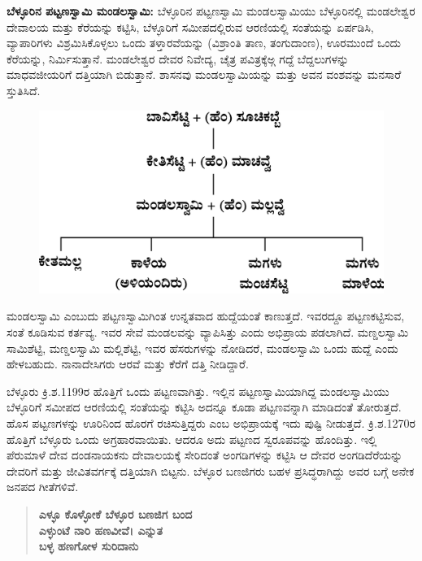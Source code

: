 \textbf{ಬೆಳ್ಳೂರಿನ ಪಟ್ಟಣಸ್ವಾಮಿ ಮಂಡಲಸ್ವಾಮಿ: } ಬೆಳ್ಳೂರಿನ ಪಟ್ಟಣಸ್ವಾಮಿ ಮಂಡಲಸ್ವಾಮಿಯು ಬೆಳ್ಳೂರಿನಲ್ಲಿ ಮಂಡಲೇಶ್ವರ ದೇವಾಲಯ ಮತ್ತು ಕೆರೆಯನ್ನು ಕಟ್ಟಿಸಿ, ಬೆಳ್ಳೂರಿಗೆ ಸಮೀಪದಲ್ಲಿರುವ ಆರಣಿಯಲ್ಲಿ ಸಂತೆಯನ್ನು ಏರ್ಪಡಿಸಿ, ವ್ಯಾಪಾರಿಗಳು ವಿಶ್ರಮಿಸಿಕೊಳ್ಳಲು ಒಂದು ತಳ್ತಾರವೆಯನ್ನು (ವಿಶ್ರಾಂತಿ ತಾಣ, ತಂಗುದಾಂಣ), ಊರಮುಂದೆ ಒಂದು ಕೆರೆಯನ್ನು, ನಿರ್ಮಿಸುತ್ತಾನೆ. ಮಂಡಲೇಶ್ವರ ದೇವರ ನಿವೇದ್ಯ, ಚೈತ್ರ ಪವಿತ್ರಕ್ಕೆಅ್ಗ ಗದ್ದೆ ಬೆದ್ದಲುಗಳನ್ನು ಮಾಧವಜೀಯರಿಗೆ ದತ್ತಿಯಾಗಿ ಬಿಡುತ್ತಾನೆ. ಶಾಸನವು ಮಂಡಲಸ್ವಾಮಿಯನ್ನು ಮತ್ತು ಅವನ ವಂಶವನ್ನು ಮನಸಾರೆ ಸ್ತುತಿಸಿದೆ.

\begin{figure}[!h]
\includegraphics{"images/chap7/chap7fig1.jpeg"}
\end{figure}

ಮಂಡಲಸ್ವಾಮಿ ಎಂಬುದು ಪಟ್ಟಣಸ್ವಾಮಿಗಿಂತ ಉನ್ನತವಾದ ಹುದ್ದೆಯಂತೆ ಕಾಣುತ್ತದೆ. ಇವರದ್ದೂ ಪಟ್ಟಣಕಟ್ಟಿಸುವ, ಸಂತೆ ಕೂಡಿಸುವ ಕರ್ತವ್ಯ. ಇವರ ಸೇವೆ ಮಂಡಲವನ್ನು ವ್ಯಾಪಿಸಿತ್ತು ಎಂದು ಅಭಿಪ್ರಾಯ ಪಡಲಾಗಿದೆ. ಮಣ್ಡಲಸ್ವಾಮಿ ಸಾಮಿಶೆಟ್ಟಿ, ಮಣ್ಡಲಸ್ವಾಮಿ ಮಲ್ಲಿಶೆಟ್ಟಿ, ಇವರ ಹೆಸರುಗಳನ್ನು ನೋಡಿದರೆ, ಮಂಡಲಸ್ವಾಮಿ ಒಂದು ಹುದ್ದೆ ಎಂದು ಹೇಳಬಹುದು. ನಾನಾದೇಸಿಗರು ಆರವೆ ಮತ್ತು ಕೆರೆಗೆ ದತ್ತಿ ನೀಡಿದ್ದಾರೆ.

ಬೆಳ್ಳೂರು ಕ್ರಿ.ಶ.1199ರ ಹೊತ್ತಿಗೆ ಒಂದು ಪಟ್ಟಣವಾಗಿತ್ತು. ಇಲ್ಲಿನ ಪಟ್ಟಣಸ್ವಾಮಿಯಾಗಿದ್ದ ಮಂಡಲಸ್ವಾಮಿಯು ಬೆಳ್ಳೂರಿಗೆ ಸಮೀಪದ ಆರಣಿಯಲ್ಲಿ ಸಂತೆಯನ್ನು ಕಟ್ಟಿಸಿ ಅದನ್ನೂ ಕೂಡಾ ಪಟ್ಟಣವನ್ನಾಗಿ ಮಾಡಿದಂತೆ ತೋರುತ್ತದೆ. ಹೊಸ ಪಟ್ಟಣಗಳನ್ನು ಊರಿನಿಂದ ಹೊರಗೆ ರಚಿಸುತ್ತಿದ್ದರು ಎಂಬ ಅಭಿಪ್ರಾಯಕ್ಕೆ ಇದು ಪುಷ್ಟಿ ನೀಡುತ್ತದೆ. ಕ್ರಿ.ಶ.1270ರ ಹೊತ್ತಿಗೆ ಬೆಳ್ಳೂರು ಒಂದು ಅಗ್ರಹಾರವಾಯಿತು. ಆದರೂ ಅದು ಪಟ್ಟಣದ ಸ್ವರೂಪವನ್ನು ಹೊಂದಿತ್ತು. ಇಲ್ಲಿ ಪೆರುಮಾಳೆ ದೇವ ದಂಡನಾಯಕನು ದೇವಾಲಯಕ್ಕೆ ಸೇರಿದಂತೆ ಅಂಗಡಿಗಳನ್ನು ಕಟ್ಟಿಸಿ ಆ ದೇವರ ಅಂಗಡಿದೆರೆಯನ್ನು ದೇವರಿಗೆ ಮತ್ತು ಜೀವಿತವರ್ಗಕ್ಕೆ ದತ್ತಿಯಾಗಿ ಬಿಟ್ಟನು. ಬೆಳ್ಳೂರ ಬಣಜಿಗರು ಬಹಳ ಪ್ರಸಿದ್ಧರಾಗಿದ್ದು ಅವರ ಬಗ್ಗೆ ಅನೇಕ ಜನಪದ ಗೀತೆಗಳಿವೆ.

\begin{verse}
\textbf{ಎಳ್ಳೂ ಕೊಳ್ಳೋಕೆ ಬೆಳ್ಳೂರ ಬಣಜಿಗ ಬಂದ} \\\textbf{ಎಳ್ಳುಂಟೆ ನಾರಿ ಹಣವೀವೆ। ಎನ್ನುತ} \\\textbf{ಬಳ್ಳ ಹಣಗೋಳ ಸುರಿದಾನು}
\end{verse}

